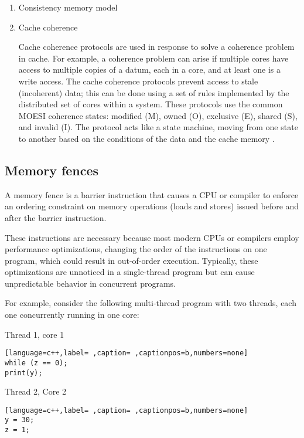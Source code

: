 \begin{enumerate}
\item Consistency memory model
\label{sec:org5f315b5}



\item Cache coherence
\label{sec:org01ed92c}

Cache coherence protocols are used in response to solve a coherence problem in cache. For example, a coherence problem can arise if multiple cores have access to multiple copies of a datum, each in a core, and at least one is a write access. The cache coherence protocols prevent access to stale (incoherent) data; this can be done using a set of rules implemented by the distributed set of cores within a system. These protocols use the common MOESI coherence states: modified (M), owned (O), exclusive (E), shared (S), and invalid (I). The protocol acts like a state machine, moving from one state to another based on the conditions of the data and the cache memory \cite{DBLP_series_synthesis_2020Nagarajan}.
\end{enumerate}



\subsection{Memory fences}
\label{sec:org8a96e19}

A memory fence is a barrier instruction that causes a CPU or compiler to enforce an ordering constraint on memory operations (loads and stores) issued before and after the barrier instruction.

These instructions are necessary because most modern CPUs or compilers employ performance optimizations, changing the order of the instructions on one program, which could result in out-of-order execution. Typically, these optimizations are unnoticed in a single-thread program but can cause unpredictable behavior in concurrent programs.

For example, consider the following multi-thread program with two threads, each one concurrently running in one core:

Thread 1, core 1
\begin{lstlisting}[language=c++,label= ,caption= ,captionpos=b,numbers=none]
while (z == 0);
print(y);
\end{lstlisting}

Thread 2, Core 2
\begin{lstlisting}[language=c++,label= ,caption= ,captionpos=b,numbers=none]
y = 30;
z = 1;
\end{lstlisting}

